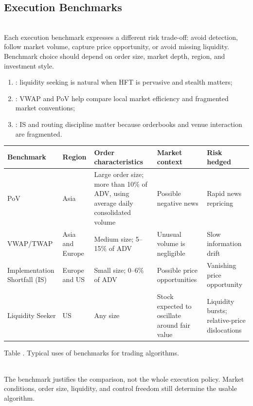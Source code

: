 \subsection{Execution Benchmarks}

\begin{principle} \\
Each execution benchmark expresses a different risk trade-off: avoid detection, follow market volume, capture price opportunity, or avoid missing liquidity. Benchmark choice should depend on order size, market depth, region, and investment style.
\end{principle}

\begin{taxonomy} 
\begin{enumerate}[label=\roman*.]
\setlength{\itemsep}{0pt}
\item {}: liquidity seeking is natural when HFT is pervasive and stealth matters;
\item {}: VWAP and PoV help compare local market efficiency and fragmented market conventions;
\item {}: IS and routing discipline matter because orderbooks and venue interaction are fragmented.
\end{enumerate}
\end{taxonomy}

\begin{table}[htbp]
\centering
\scriptsize
{}
\renewcommand{\arraystretch}{1.12}
\setlength{\tabcolsep}{4pt}
\begin{tabularx}{\textwidth}{@{}>{\RaggedRight\arraybackslash}p{} >{\RaggedRight\arraybackslash}p{} >{\RaggedRight\arraybackslash}p{} >{\RaggedRight\arraybackslash}p{} >{\RaggedRight\arraybackslash}X@{}}
\hline
\textbf{Benchmark} & \textbf{Region} & \textbf{Order characteristics} & \textbf{Market context} & \textbf{Risk hedged} \\
\hline
PoV & Asia & Large order size; more than 10\% of ADV, using average daily consolidated volume & Possible negative news & Rapid news repricing \\
VWAP/TWAP & Asia and Europe & Medium size; 5--15\% of ADV & Unusual volume is negligible & Slow information drift \\
Implementation Shortfall (IS) & Europe and US & Small size; 0--6\% of ADV & Possible price opportunities & Vanishing price opportunity \\
Liquidity Seeker & US & Any size & Stock expected to oscillate around fair value & Liquidity bursts; relative-price dislocations \\
\hline
\end{tabularx}

\vspace{0.25em}
{\footnotesize Table \thetable. Typical uses of benchmarks for trading algorithms.}
\end{table}

\begin{caveat} \\
The benchmark justifies the comparison, not the whole execution policy. Market conditions, order size, liquidity, and control freedom still determine the usable algorithm.
\end{caveat}
